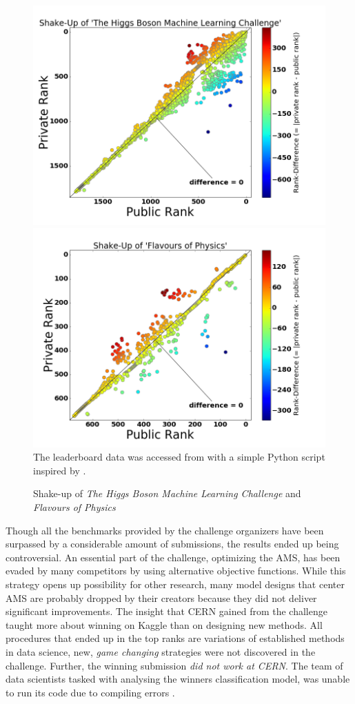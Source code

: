 \begin{figure}
\begin{center}
	\includegraphics[trim=15 0 40 0,clip,width=.47\textwidth]{images/shakeup}
	\quad
	\includegraphics[trim=15 0 40 0,clip,width=.47\textwidth]{images/flavshakeup}
	The leaderboard data was accessed from \cite{kaggle} with a simple Python script inspired by \cite{hebert}.
	\caption{Shake-up of \emph{The Higgs Boson Machine Learning Challenge} and \emph{Flavours of Physics}}
	\label{fig:shakeup}
\end{center}
\end{figure}

Though all the benchmarks provided by the challenge organizers have been surpassed by a considerable amount of submissions, the results ended up being controversial. An essential part of the challenge, optimizing the AMS, has been evaded by many competitors by using alternative objective functions. While this strategy opens up possibility for other research, many model designs that center AMS are probably dropped by their creators because they did not deliver significant improvements. 
The insight that CERN gained from the challenge taught more about winning on Kaggle than on designing new methods. All procedures that ended up in the top ranks are variations of established methods in data science, new, \emph{game changing} strategies were not discovered in the challenge. Further, the winning submission \emph{did not work at CERN}. The team of data scientists tasked with analysing the winners classification model, was unable to run its code due to compiling errors \cite{keglblog}.

